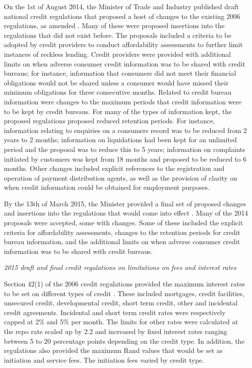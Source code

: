 \documentclass[
  letterpaper,
  DIV=11,
  numbers=noendperiod]{scrartcl}
\begin{document}
On the 1st of August 2014, the Minister of Trade and Industry published
draft national credit regulations that proposed a host of changes to the
existing 2006 regulations, as amended \citep{regulations2014b}. Many of
these were proposed insertions into the regulations that did not exist
before. The proposals included a criteria to be adopted by credit
providers to conduct affordability assessments to further limit
instances of reckless lending. Credit providers were provided with
additional limits on when adverse consumer credit information was to be
shared with credit bureaus; for instance, information that consumers did
not meet their financial obligations would not be shared unless a
consumer would have missed their minimum obligations for three
consecutive months. Related to credit bureau information were changes to
the maximum periods that credit information were to be kept by credit
bureaus. For many of the types of information kept, the proposed
regulations proposed reduced retention periods. For instance,
information relating to enquiries on a consumers record was to be
reduced from 2 years to 2 months; information on liquidations had been
kept for an unlimited period and the proposal was to reduce this to 5
years; information on complaints initiated by customers was kept from 18
months and proposed to be reduced to 6 months. Other changes included
explicit references to the registration and operation of payment
distribution agents, as well as the provision of clarity on when credit
information could be obtained for employment purposes.

By the 13th of March 2015, the Minister provided a final set of proposed
changes and insertions into the regulations that would come into effect
\citep{regulations2015a}. Many of the 2014 proposals were accepted, some
with changes. Some of these included the explicit criteria for
affordability assessments, changes to the retention periods for credit
bureau information, and the additional limits on when adverse consumer
credit information was to be shared with credit bureaus.

\emph{2015 draft and final credit regulations on limitations on fees and
interest rates}

Section 42(1) of the 2006 credit regulations provided the maximum
interest rates to be set on different types of credit
\citep{regulations2006}. These included mortgages, credit facilities,
unsecured credit, developmental credit, short term credit, other and
incidental credit agreements. Incidental and short term credit rates
were respectively capped at 2\% and 5\% per month. The limits for other
rates were calculated at the repo rate scaled up by 2.2 and increased by
fixed interest rates ranging between 5 to 20 percentage points depending
on the credit type. In addition, the regulations also provided the
maximum Rand values that would be set as initiation and service fees.
The initiation fees varied by credit type.
\end{document}
